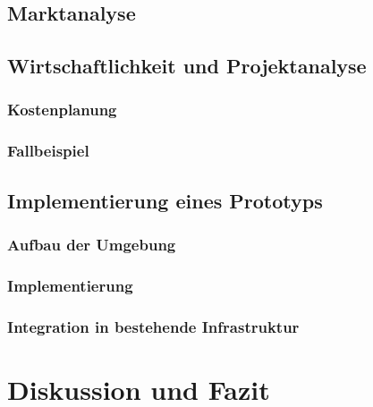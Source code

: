 \documentclass[a4paper, 12pt, oneside]{scrbook}
\begin{document}
	
	\section{Marktanalyse}
	
	
	\section{Wirtschaftlichkeit und Projektanalyse}
	
		\subsection{Kostenplanung}
		
		\subsection{Fallbeispiel}
	
	\section{Implementierung eines Prototyps}
	
		\subsection{Aufbau der Umgebung}
		
		\subsection{Implementierung}
		
			
		
		\subsection{Integration in bestehende Infrastruktur}
			

	
	
	\chapter{Diskussion und Fazit}\label{ch:Diskussion_Fazit}
	
	
	
	
	\frontmatter
	\printbibliography
\end{document}
